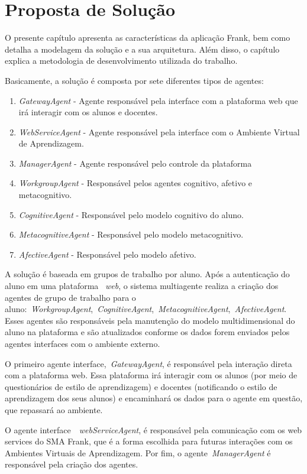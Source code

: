 \chapter{Proposta de Solução}

O presente capítulo apresenta as características da aplicação Frank, bem como detalha a modelagem da solução e a sua arquitetura. Além disso, o capítulo explica a metodologia de desenvolvimento utilizada do trabalho.

Basicamente, a solução é composta por sete diferentes tipos de agentes:
\begin{enumerate}
	\item \emph{GatewayAgent} - Agente responsável pela interface com a plataforma web que irá interagir com os alunos e docentes.
	\item \emph{WebServiceAgent} - Agente responsável pela interface com o Ambiente Virtual de Aprendizagem.
	\item \emph{ManagerAgent} - Agente responsável pelo controle da plataforma
	\item \emph{WorkgroupAgent} - Responsável pelos agentes cognitivo, afetivo e metacognitivo.
	\item \emph{CognitiveAgent} - Responsável pelo modelo cognitivo do aluno.
	\item \emph{MetacognitiveAgent} - Responsável pelo modelo metacognitivo.
	\item \emph{AfectiveAgent} - Responsável pelo modelo afetivo.
\end{enumerate}

A solução é baseada em grupos de trabalho por aluno. Após a autenticação do aluno em uma plataforma ~\emph{web}, o sistema multiagente realiza a criação dos agentes de grupo de trabalho para o aluno:~\emph{WorkgroupAgent},~\emph{CognitiveAgent},~\emph{MetacognitiveAgent},~\emph{AfectiveAgent}. Esses agentes são responsáveis pela manutenção do modelo multidimensional do aluno na plataforma e são atualizados conforme os dados forem enviados pelos agentes interfaces com o ambiente externo.

O primeiro agente interface,~\emph{GatewayAgent}, é responsável pela interação direta com a plataforma web. Essa plataforma irá interagir com os alunos (por meio de questionários de estilo de aprendizagem) e docentes (notificando o estilo de aprendizagem dos seus alunos) e encaminhará os dados para o agente em questão, que repassará ao ambiente.

O agente interface~\emph{~\emph{web}ServiceAgent}, é responsável pela comunicação com os web services do SMA Frank, que é a forma escolhida para futuras interações com os Ambientes Virtuais de Aprendizagem. Por fim, o agente~\emph{ManagerAgent} é responsável pela criação dos agentes.

